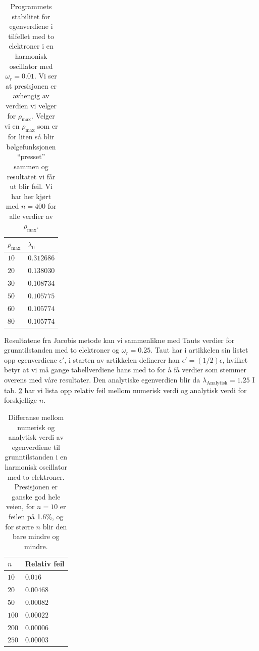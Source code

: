\documentclass[norsk, 12pt]{article}
\theoremstyle{definition} \newtheorem{defi}{Definisjon}[subsection]
\theoremstyle{definition} \newtheorem{teo}{Teorem}[subsection]
\theoremstyle{definition} \newtheorem*{eks}{Eksempel}
\begin{document}
\begin{table}[H]
  \centering
  \begin{tabular}{ l l }
    \toprule
    $\rho_\text{max}$ & $\lambda_0$  \\
    \midrule
	$10$ & $0.312686$ \\
	$20$ & $0.138030$ \\
	$30$ & $0.108734$ \\
	$50$ & $0.105775$ \\
	$60$ & $0.105774$ \\
	$80$ & $0.105774$ \\
	\bottomrule
  \end{tabular}
  \caption{Programmets stabilitet for egenverdiene i tilfellet med to elektroner i en harmonisk oscillator med $\omega_r = 0.01$. Vi ser at presisjonen er avhengig av verdien vi velger for $\rho_\text{max}$. Velger vi en $\rho_\text{max}$ som er for liten så blir bølgefunksjonen ``presset'' sammen og resultatet vi får ut blir feil. Vi har her kjørt med $n=400$ for alle verdier av $\rho_\text{max}$.}
  \label{tab:rhomax}
\end{table}

Resultatene fra Jacobis metode kan vi sammenlikne med Tauts \cite{Taut} verdier for grunntilstanden med to elektroner og $\omega_r = 0.25$. Taut har i artikkelen sin listet opp egenverdiene $\epsilon'$, i starten av artikkelen definerer han $\epsilon' = (1/2)\epsilon$, hvilket betyr at vi må gange tabellverdiene hans med to for å få verdier som stemmer overens med våre resultater. Den analytiske egenverdien blir da $\lambda_\text{Analytisk} = 1.25$ I tab. \ref{tab:taut} har vi lista opp relativ feil mellom numerisk verdi og analytisk verdi for forskjellige $n$.

\begin{table}[H]
  \centering
  \begin{tabular}{ l l }
    \toprule
    $n$ & Relativ feil \\
    \midrule
    $10$ &  $0.016$ \\
    $20$ &  $0.00468$ \\
	$50$ &  $0.00082$ \\
	$100$ & $0.00022$ \\
	$200$ & $0.00006$ \\
	$250$ & $0.00003$ \\
	\bottomrule
  \end{tabular}
  \caption{Differanse mellom numerisk og analytisk verdi av egenverdiene til grunntilstanden i en harmonisk oscillator med to elektroner. Presisjonen er ganske god hele veien, for $n=10$ er feilen på 1.6\%, og for større $n$ blir den bare mindre og mindre.}
  \label{tab:taut}
\end{table}
\end{document}
